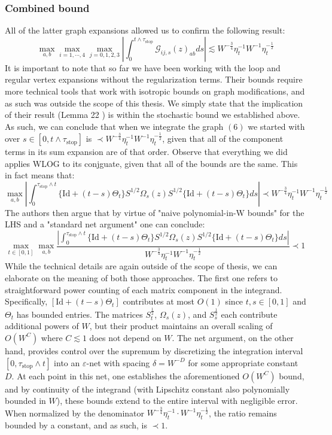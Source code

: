 \documentclass[11pt]{article}
\newcommand{\sto}{\text{stop}}
\begin{document}
\subsubsection*{Combined bound}
All of the latter graph expansions allowed us to confirm the following result: $$\max_{a,b}\max_{i=1, \cdots, 4}\max_{j=0, 1, 2, 3} \left\vert \int_0^{t\wedge \tau_\sto}\mathcal{G}_{ij, s}(z)_{ab}ds\right\vert\lesssim W^{-\frac{3}{4}}\eta_t^{-1}W^{-1}\eta_t^{-\frac{1}{2}}$$
It is important to note that so far we have been working with the loop and regular vertex expansions without the regularization terms. Their bounds require more technical tools that work with isotropic bounds on graph modifications, and as such was outside the scope of this thesis. We simply state that the implication of their result (Lemma 22 \cite{bandSDE}) is within the stochastic bound we established above. As such, we can conclude that when we integrate the graph \hyperref[graph]{$(6)$} we started with over $s\in [0, t\wedge \tau_\sto]$ is $\prec W^{-\frac{3}{4}}\eta_t^{-1}W^{-1}\eta_t^{-\frac{1}{2}}$, given that all of the component terms in its sum expansion are of that order. Observe that everything we did applies WLOG to its conjguate, given that all of the bounds are the same. This in fact means that: $$\max_{a, b}\left\vert \int_0^{\tau_\sto\wedge t} \{\text{Id} + (t-s)\Theta_t\} S^{1/2}\Omega_s(z)S^{1/2} \{\text{Id} + (t-s)\Theta_t\}ds\right\vert \prec W^{-\frac{3}{4}}\eta_t^{-1}W^{-1}\eta_t^{-\frac{1}{2}}$$
The authors then argue that by virtue of "naive polynomial-in-W bounds" for the LHS and a "standard net argument" \cite{bandSDE} one can conclude:
$$\max_{t\in [0, 1]}\max_{a, b}\frac{\left\vert \int_0^{\tau_\sto\wedge t} \{\text{Id} + (t-s)\Theta_t\} S^{1/2}\Omega_s(z)S^{1/2} \{\text{Id} + (t-s)\Theta_t\}ds\right\vert }{W^{-\frac{3}{4}}\eta_t^{-1}W^{-1}\eta_t^{-\frac{1}{2}}}\prec 1$$
While the technical details are again outside of the scope of thesis, we can elaborate on the meaning of both those approaches. The first one refers to straightforward power counting of each matrix component in the integrand. Specifically, $[\text{Id} + (t - s)\Theta_t]$ contributes at most $O(1)$ since $t,s \in [0,1]$ and $\Theta_t$ has bounded entries. The matrices $S_t^{\frac{1}{2}}$, $\Omega_s(z)$, and $S_s^{\frac{1}{2}}$ each contribute additional powers of $W$, but their product maintains an overall scaling of $O(W^C)$ where $C\lesssim 1$ does not depend on $W$. The net argument, on the other hand, provides control over the supremum by discretizing the integration interval $[0, \tau_{\text{stop}} \wedge t]$ into an $\varepsilon$-net with spacing $\delta = W^{-D}$ for some appropriate constant $D$. At each point in this net, one establishes the aforementioned $O(W^C)$ bound, and by continuity of the integrand (with Lipschitz constant also polynomially bounded in $W$), these bounds extend to the entire interval with negligible error. When normalized by the denominator $W^{-\frac{3}{4}}\eta_t^{-1} \cdot W^{-1}\eta_t^{-\frac{1}{2}}$, the ratio remains bounded by a constant, and as such, is $\prec 1$. 
\end{document}
